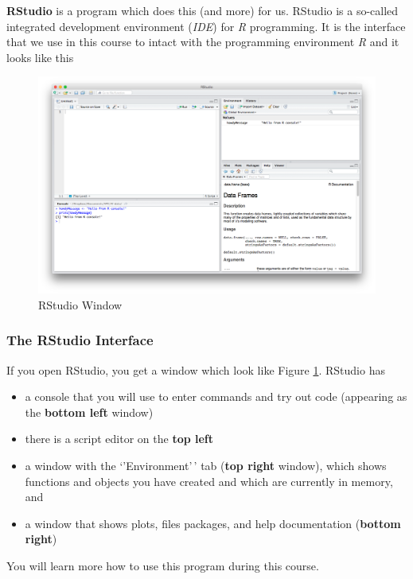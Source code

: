 \documentclass[
]{scrartcl}
\providecommand{\tightlist}{%
  \setlength{\itemsep}{0pt}\setlength{\parskip}{0pt}}
\begin{document}
\textbf{RStudio} is a program which does this (and more) for us. RStudio is a so-called integrated development environment (\emph{IDE}) for \emph{R} programming. It is the interface that we use in this course to intact with the programming environment \emph{R} and it looks like this

\begin{figure}
\includegraphics[width=650px]{images/rstudio} \caption{RStudio Window}\label{fig:rstudio}
\end{figure}

\subsubsection{The RStudio Interface}\label{the-rstudio-interface}

If you open RStudio, you get a window which look like Figure \ref{fig:rstudio}. RStudio has

\begin{itemize}
\tightlist
\item
  a console that you will use to enter commands and try out code (appearing as the \textbf{bottom left} window)
\item
  there is a script editor on the \textbf{top left}
\item
  a window with the `'Environment'\,' tab (\textbf{top right} window), which shows functions and objects you have created and which are currently in memory, and
\item
  a window that shows plots, files packages, and help documentation (\textbf{bottom right})
\end{itemize}

You will learn more how to use this program during this course.
\end{document}
